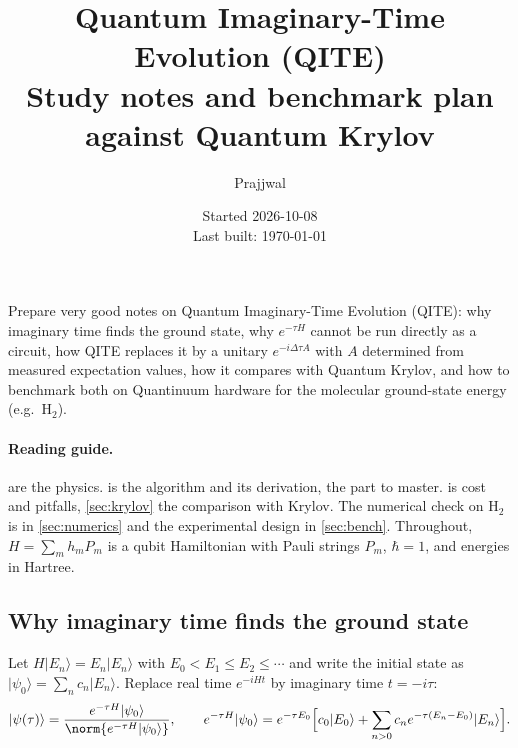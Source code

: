\documentclass[11pt,a4paper]{article}
\title{Quantum Imaginary-Time Evolution (QITE)\\\large Study notes and benchmark plan against Quantum Krylov}
\author{Prajjwal}
\date{Started 2026-10-08 \\ \small Last built: \today}
\newcommand{\ket}[1]{\lvert #1\rangle}
\begin{document}
\maketitle
\tableofcontents
\bigskip


\begin{question}
Prepare very good notes on Quantum Imaginary-Time Evolution (QITE): why imaginary time finds
the ground state, why $e^{-\tau H}$ cannot be run directly as a circuit, how QITE replaces it
by a unitary $e^{-i\Delta\tau A}$ with $A$ determined from measured expectation values, how it
compares with Quantum Krylov, and how to benchmark both on Quantinuum hardware for the
molecular ground-state energy (e.g.\ $\mathrm{H}_2$).
\end{question}

\paragraph{Reading guide.}
 are the physics.  is the algorithm and its
derivation, the part to master.  is cost and pitfalls, \cref{sec:krylov}
the comparison with Krylov. The numerical check on $\mathrm{H}_2$ is in
\cref{sec:numerics} and the experimental design in \cref{sec:bench}. Throughout,
$H=\sum_{m}h_m P_m$ is a qubit Hamiltonian with Pauli strings $P_m$, $\hbar=1$, and energies
in Hartree.

\subsection{Why imaginary time finds the ground state}\label{sec:why}

Let $H\ket{E_n}=E_n\ket{E_n}$ with $E_0<E_1\le E_2\le\cdots$ and write the initial state as
$\ket{\psi_0}=\sum_n c_n\ket{E_n}$. Replace real time $e^{-iHt}$ by imaginary time
$t=-i\tau$:
\begin{equation}
  \ket{\psi(\tau)}=\frac{e^{-\tau H}\ket{\psi_0}}{\norm{e^{-\tau H}\ket{\psi_0}}},
  \qquad
  e^{-\tau H}\ket{\psi_0}=e^{-\tau E_0}\Big[c_0\ket{E_0}+\sum_{n>0}c_n e^{-\tau(E_n-E_0)}\ket{E_n}\Big].
\end{equation}
\end{document}
